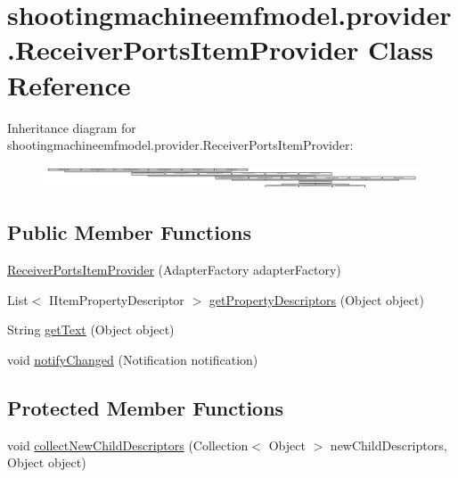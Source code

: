 \hypertarget{classshootingmachineemfmodel_1_1provider_1_1_receiver_ports_item_provider}{\section{shootingmachineemfmodel.\-provider.\-Receiver\-Ports\-Item\-Provider Class Reference}
\label{classshootingmachineemfmodel_1_1provider_1_1_receiver_ports_item_provider}
}
Inheritance diagram for shootingmachineemfmodel.\-provider.\-Receiver\-Ports\-Item\-Provider\-:\begin{figure}[H]
\begin{center}
\leavevmode
\includegraphics[height=0.680603cm]{classshootingmachineemfmodel_1_1provider_1_1_receiver_ports_item_provider}
\end{center}
\end{figure}
\subsection*{Public Member Functions}
\begin{DoxyCompactItemize}
\item 
\hyperlink{classshootingmachineemfmodel_1_1provider_1_1_receiver_ports_item_provider_aadcb2de59a303467df94eb0b92ea3b79}{Receiver\-Ports\-Item\-Provider} (Adapter\-Factory adapter\-Factory)
\item 
List$<$ I\-Item\-Property\-Descriptor $>$ \hyperlink{classshootingmachineemfmodel_1_1provider_1_1_receiver_ports_item_provider_a5c04a21b2bf40a2ca809e045060941b6}{get\-Property\-Descriptors} (Object object)
\item 
String \hyperlink{classshootingmachineemfmodel_1_1provider_1_1_receiver_ports_item_provider_ae5bee951f0f340e1f62c6aa161946c86}{get\-Text} (Object object)
\item 
void \hyperlink{classshootingmachineemfmodel_1_1provider_1_1_receiver_ports_item_provider_aaf9992cd2cc7991d654cd7b60ff12c69}{notify\-Changed} (Notification notification)
\end{DoxyCompactItemize}
\subsection*{Protected Member Functions}
\begin{DoxyCompactItemize}
\item 
void \hyperlink{classshootingmachineemfmodel_1_1provider_1_1_receiver_ports_item_provider_a5de9ba6e7c4084a915448e0fccfe8532}{collect\-New\-Child\-Descriptors} (Collection$<$ Object $>$ new\-Child\-Descriptors, Object object)
\end{DoxyCompactItemize}


